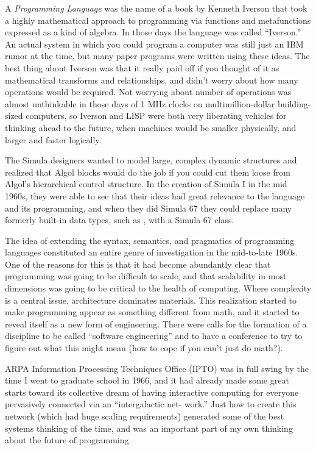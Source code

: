 \documentclass[a4paper,10pt,twoside]{book}
\begin{document}
A \emph{Programming Language} was the name of a book by Kenneth Iverson that took a highly mathematical approach to programming via functions and metafunctions expressed as a kind of algebra. In those days the language was called “Iverson.” An actual system in which you could program a computer was still just an IBM rumor at the time, but many paper programs were written using these ideas. The best thing about Iverson was that it really paid off if you thought of it as mathematical transforms and
 relationships, and didn’t worry about how many operations would be
 required. Not worrying about number of operations was almost unthinkable in those days of 1 MHz clocks on multimillion-dollar building-sized computers, so Iverson and LISP were both very liberating vehicles for thinking ahead to the future, when machines would be smaller physically, and larger and faster logically. 


The Simula designers wanted to model large, complex dynamic structures and realized that Algol blocks would do the job if you could cut them loose from Algol’s hierarchical control 
structure. In the creation of Simula I in the mid 1960s, they were able to see that their ideas 
had great relevance to the language and its programming, and when they did Simula 67 they 
could replace many formerly built-in data types, such as , with a Simula 67 class. 

The idea of extending the syntax, semantics, and pragmatics of programming languages 
constituted an entire genre of investigation in the mid-to-late 1960s. One of the reasons for 
this is that it had become abundantly clear that programming was going to be difficult to 
scale, and that scalability in most dimensions was going to be critical to the health of computing. Where complexity is a central issue, architecture dominates materials. This realization 
started to make programming appear as something different from math, and it started to 
reveal itself as a new form of engineering. There were calls for the formation of a discipline to 
be called “software engineering” and to have a conference to try to figure out what this might 
mean (how to cope if you can’t just do math?). 


ARPA Information Processing Techniques Office (IPTO) was in full swing by the time I went 
to graduate school in 1966, and it had already made some great starts toward its collective dream 
of having interactive computing for everyone pervasively connected via an “intergalactic net- 
work.” Just how to create this network (which had huge scaling requirements) generated some of 
the best systems thinking of the time, and was an important part of my own thinking about the 
future of programming. 
\end{document}
